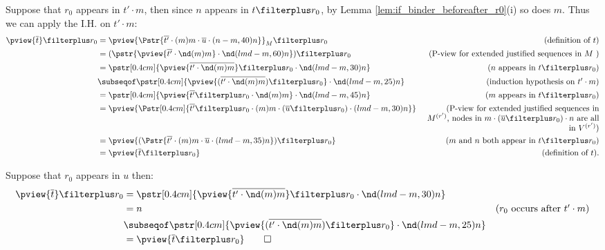\begin{itemize}
     Suppose that $r_0$ appears in $t' \cdot m$, then since $n$ appears in $t\filterplus r_0$, by Lemma \ref{lem:if_binder_beforeafter_r0}(i) so does $m$. Thus we can apply the I.H. on $t' \cdot m$:
     \begin{align*}
        \pview{\overline{t}} \filterplus r_0
        &= \pview{\Pstr{\overline{t'} \cdot (m){m} \cdot \overline{u} \cdot (n-m,40){n}}}_M \filterplus r_0
                & (\mbox{definition of } t)\\
        &= (\pstr{\pview{\overline{t'} \cdot \nd(m){m}}  \cdot \nd(lmd-m,60){n}}) \filterplus r_0
                & (\mbox{P-view for extended justified sequences in $M$ }) \\
        &= \pstr[0.4cm]{ \pview{\overline{t' \cdot \nd(m){m}}} \filterplus r_0  \cdot  \nd(lmd-m,30){n} }
                & (\mbox{$n$ appears in $t \filterplus r_0$}) \\
        &\subseqof \pstr[0.4cm]{ \pview{(\overline{t' \cdot \nd(m){m}} )\filterplus r_0} \cdot \nd(lmd-m,25){n} }
                & \mbox{(induction hypothesis on $t' \cdot m$)} \\
        &= \pstr[0.4cm]{ \pview{\overline{t'}\filterplus r_0 \cdot \nd(m){m}} \cdot \nd(lmd-m,45){n} }
                & \mbox{($m$ appears in $t \filterplus r_0$)} \\
        &= \pview{ \Pstr[0.4cm]{\overline{t'} \filterplus r_0 \cdot (m){m} \cdot {(\overline{u} \filterplus r_0)} \cdot (lmd-m,30){n}}}
                & \parbox[t]{7.5cm}{\raggedleft(P-view for extended justified sequences in $M^{(r')}$, nodes in $m\cdot (\overline{u} \filterplus r_0) \cdot n$ are all in $V^{(r')}$)} \\
        &= \pview{ (\Pstr{\overline{t'} \cdot (m){m} \cdot \overline{u} \cdot (lmd-m,35){n}}) \filterplus r_0 }
                & \mbox{($m$ and $n$ both appear in } t \filterplus r_0) \\
        &= \pview{ \overline{t} \filterplus r_0 }
                & \mbox{(definition of $t$).}
      \end{align*}

      Suppose that $r_0$ appears in $u$ then:
      \begin{align*}
        \pview{\overline{t}} \filterplus r_0
        &= \pstr[0.4cm]{ \pview{\overline{t' \cdot \nd(m){m}}}
           \filterplus r_0  \cdot  \nd(lmd-m,30){n} } \\
        &= n & (\mbox{$r_0$ occurs after $t'\cdot m$}) \\
            &\subseqof \pstr[0.4cm]{ \pview{(\overline{t' \cdot \nd(m){m}} )\filterplus r_0} \cdot \nd(lmd-m,25){n} }
                \\
        &= \pview{ \overline{t} \filterplus r_0 } \qed
      \end{align*}
\end{itemize}

